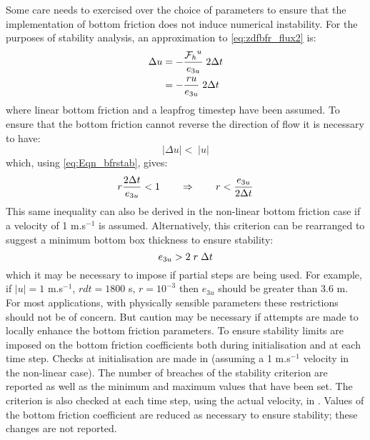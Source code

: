 \documentclass[../tex_main/NEMO_manual]{subfiles}
\begin{document}
Some care needs to exercised over the choice of parameters to ensure that the implementation of
bottom friction does not induce numerical instability.
For the purposes of stability analysis, an approximation to \autoref{eq:zdfbfr_flux2} is:
\begin{equation} \label{eq:Eqn_bfrstab}
\begin{split}
 \Delta u &= -\frac{{{\cal F}_h}^u}{e_{3u}}\;2 \Delta t    \\
               &= -\frac{ru}{e_{3u}}\;2\Delta t\\
\end{split}
\end{equation}
\noindent where linear bottom friction and a leapfrog timestep have been assumed.
To ensure that the bottom friction cannot reverse the direction of flow it is necessary to have:
\begin{equation}
 |\Delta u| < \;|u| 
\end{equation}
\noindent which, using \autoref{eq:Eqn_bfrstab}, gives:
\begin{equation}
r\frac{2\Delta t}{e_{3u}} < 1 \qquad  \Rightarrow \qquad r < \frac{e_{3u}}{2\Delta t}\\
\end{equation}
This same inequality can also be derived in the non-linear bottom friction case if
a velocity of 1 m.s$^{-1}$ is assumed.
Alternatively, this criterion can be rearranged to suggest a minimum bottom box thickness to ensure stability:
\begin{equation}
e_{3u} > 2\;r\;\Delta t
\end{equation}
\noindent which it may be necessary to impose if partial steps are being used.
For example, if $|u| = 1$ m.s$^{-1}$, $rdt = 1800$ s, $r = 10^{-3}$ then $e_{3u}$ should be greater than 3.6 m.
For most applications, with physically sensible parameters these restrictions should not be of concern.
But caution may be necessary if attempts are made to locally enhance the bottom friction parameters. 
To ensure stability limits are imposed on the bottom friction coefficients both
during initialisation and at each time step.
Checks at initialisation are made in  (assuming a 1 m.s$^{-1}$ velocity in the non-linear case).
The number of breaches of the stability criterion are reported as well as
the minimum and maximum values that have been set.
The criterion is also checked at each time step, using the actual velocity, in .
Values of the bottom friction coefficient are reduced as necessary to ensure stability;
these changes are not reported.
\end{document}
